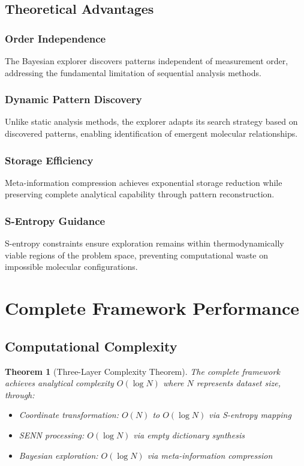 \documentclass[12pt,a4paper]{article}
\newtheorem{theorem}{Theorem}
\begin{document}
\subsection{Theoretical Advantages}

\subsubsection{Order Independence}

The Bayesian explorer discovers patterns independent of measurement order, addressing the fundamental limitation of sequential analysis methods.

\subsubsection{Dynamic Pattern Discovery}

Unlike static analysis methods, the explorer adapts its search strategy based on discovered patterns, enabling identification of emergent molecular relationships.

\subsubsection{Storage Efficiency}

Meta-information compression achieves exponential storage reduction while preserving complete analytical capability through pattern reconstruction.

\subsubsection{S-Entropy Guidance}

S-entropy constraints ensure exploration remains within thermodynamically viable regions of the problem space, preventing computational waste on impossible molecular configurations.

\section{Complete Framework Performance}

\subsection{Computational Complexity}

\begin{theorem}[Three-Layer Complexity Theorem]
The complete framework achieves analytical complexity $O(\log N)$ where $N$ represents dataset size, through:
\begin{itemize}
\item Coordinate transformation: $O(N)$ to $O(\log N)$ via S-entropy mapping
\item SENN processing: $O(\log N)$ via empty dictionary synthesis  
\item Bayesian exploration: $O(\log N)$ via meta-information compression
\end{itemize}
\end{theorem}
\end{document}
